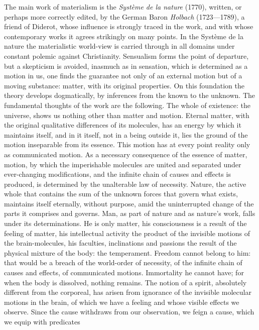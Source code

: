 The main work of materialism is the \emph{Système de la nature}
(1770), written, or perhaps more correctly edited, by the German Baron
\emph{Holbach} (1723---1789), a friend of Diderot, whose influence is
strongly traced in the work, and with whose contemporary works it
agrees strikingly on many points. In the Système de la nature the
materialistic world-view
is carried through in all domains under constant polemic against
Christianity. Sensualism forms the point of departure, but a skepticism
is avoided, inasmuch as in sensation, which is determined as a motion
in us, one finds the guarantee not only of an external motion but of a
moving substance: matter, with its original properties. On this
foundation the theory develops dogmatically, by inferences from the
known to the unknown. The fundamental thoughts of the work are the
following. The whole of existence: the universe, shows us nothing other
than matter and motion. Eternal matter, with the original qualitative
differences of its molecules, has an energy by which it maintains
itself, and in it itself, not in a being outside it, lies the ground of
the motion inseparable from its essence. This motion has at every
point reality only as communicated motion. As a necessary
consequence of the essence of matter, motion, by which the
imperishable molecules are united and separated under ever-changing
modifications, and the infinite chain of causes and effects is
produced, is determined by the unalterable law of necessity. Nature,
the active whole that contains the sum of the unknown forces that
govern what exists, maintains itself eternally, without purpose, amid
the uninterrupted change of the parts it comprises and governs. Man,
as part of nature and as nature's work, falls under its
determinations. He is only matter, his consciousness is a result of
the feeling of matter, his intellectual activity the product of the
invisible motions of the brain-molecules, his faculties, inclinations
and passions the result of the physical mixture of the body: the
temperament. Freedom cannot belong to him: that would be a breach of
the world-order of necessity, of the infinite chain of causes and
effects, of communicated motions. Immortality he cannot have; for when
the body is dissolved, nothing remains. The notion of a spirit,
absolutely different from the corporeal, has arisen from ignorance of
the invisible molecular motions in the brain, of which we have a
feeling and whose visible effects we observe. Since the cause withdraws
from our observation, we feign a cause, which we equip with predicates
